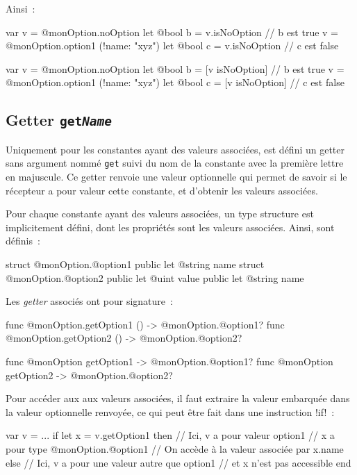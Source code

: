 Ainsi~:

\begin{galgas4}
var v = @monOption.noOption
let @bool b = v.isNoOption // b est true
v = @monOption.option1 (!name: "xyz")
let @bool c = v.isNoOption // c est false
\end{galgas4}
\begin{galgas3}
var v = @monOption.noOption
let @bool b = [v isNoOption] // b est true
v = @monOption.option1 (!name: "xyz")
let @bool c = [v isNoOption] // c est false
\end{galgas3}



\subsection{Getter \texttt{get\emph{Name}}}

Uniquement pour les constantes ayant des valeurs associées, est défini un getter sans argument nommé \texttt{get} suivi du nom  de la constante avec la première lettre en majuscule. Ce getter renvoie une valeur optionnelle qui permet de savoir si le récepteur a pour valeur cette constante, et d'obtenir les valeurs associées.

Pour chaque constante ayant des valeurs associées, un type structure est implicitement défini, dont les propriétés sont les valeurs associées. Ainsi, sont définis~:
\begin{galgas4}
struct @monOption.@option1 {
  public let @string name
}
struct @monOption.@option2 {
  public let @uint value
  public let @string name
}
\end{galgas4}

Les \emph{getter} associés ont pour signature~:
\begin{galgas4}
func @monOption.getOption1 () -> @monOption.@option1?
func @monOption.getOption2 () -> @monOption.@option2?
\end{galgas4}
\begin{galgas3}
func @monOption getOption1 -> @monOption.@option1?
func @monOption getOption2 -> @monOption.@option2?
\end{galgas3}

Pour accéder aux aux valeurs associées, il faut extraire la valeur embarquée dans la valeur optionnelle renvoyée, ce qui peut être fait dans une instruction \ggsq!if!~:

\begin{galgas4}
var v = ...
if let x = v.getOption1 then
  // Ici, v a pour valeur option1
  // x a pour type @monOption.@option1
  // On accède à la valeur associée par x.name
else
  // Ici, v a pour une valeur autre que option1
  // et x n'est pas accessible
end
\end{galgas4}

